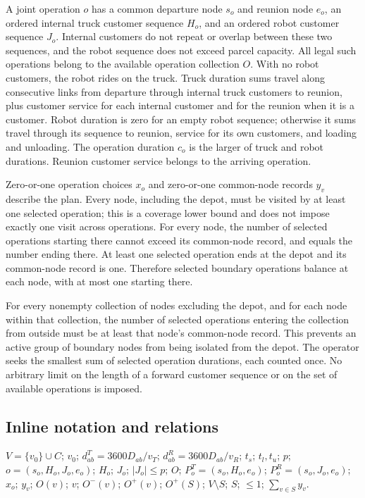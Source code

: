 \documentclass[10pt]{article}
\begin{document}
A joint operation $o$ has a common departure node $s_o$ and reunion node $e_o$, an ordered internal truck customer sequence $H_o$, and an ordered robot customer sequence $J_o$. Internal customers do not repeat or overlap between these two sequences, and the robot sequence does not exceed parcel capacity. All legal such operations belong to the available operation collection $O$. With no robot customers, the robot rides on the truck. Truck duration sums travel along consecutive links from departure through internal truck customers to reunion, plus customer service for each internal customer and for the reunion when it is a customer. Robot duration is zero for an empty robot sequence; otherwise it sums travel through its sequence to reunion, service for its own customers, and loading and unloading. The operation duration $c_o$ is the larger of truck and robot durations. Reunion customer service belongs to the arriving operation.

Zero-or-one operation choices $x_o$ and zero-or-one common-node records $y_v$ describe the plan. Every node, including the depot, must be visited by at least one selected operation; this is a coverage lower bound and does not impose exactly one visit across operations. For every node, the number of selected operations starting there cannot exceed its common-node record, and equals the number ending there. At least one selected operation ends at the depot and its common-node record is one. Therefore selected boundary operations balance at each node, with at most one starting there.

For every nonempty collection of nodes excluding the depot, and for each node within that collection, the number of selected operations entering the collection from outside must be at least that node's common-node record. This prevents an active group of boundary nodes from being isolated from the depot. The operator seeks the smallest sum of selected operation durations, each counted once. No arbitrary limit on the length of a forward customer sequence or on the set of available operations is imposed.

\subsection*{Inline notation and relations}
$V=\{v_0\}\cup C$; $v_0$; $d^T_{ab}=3600D_{ab}/v_T$; $d^R_{ab}=3600D_{ab}/v_R$; $t_s$; $t_l,t_u$; $p$; $o=(s_o,H_o,J_o,e_o)$; $H_o$; $J_o$; $|J_o|\le p$; $O$; $P^T_o=(s_o,H_o,e_o)$; $P^R_o=(s_o,J_o,e_o)$; $x_o$; $y_v$; $O(v)$; $v$; $O^-(v)$; $O^+(v)$; $O^+(S)$; $V\setminus S$; $S$; $\le1$; $\sum_{v\in S}y_v$.
\end{document}
